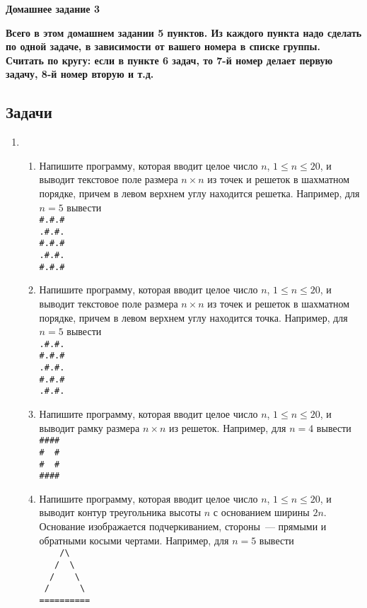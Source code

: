 \documentclass{article}
\begin{document}
\begin{center}
\bf\Large  Домашнее задание 3
\end{center}

\noindent 
\textbf{Всего в этом домашнем задании 5 пунктов. Из каждого пункта надо сделать по одной задаче, в зависимости от вашего номера в списке группы. Считать по кругу: если в пункте 6 задач, то 7-й номер делает первую задачу, 8-й номер вторую и т.д.}

\medskip
\noindent 

\subsection*{Задачи}
\begin{enumerate}[label={}, leftmargin=0pt, itemindent=0pt]
\item
\begin{enumerate}[label=\arabic{enumi}.\arabic*.]
\item
Напишите программу, которая вводит целое число $n$, $1\leqslant n \leqslant 20$, и выводит текстовое поле размера $n\times n$ из точек и решеток в шахматном порядке, причем в левом верхнем углу находится решетка.
Например, для $n=5$ вывести\\
\verb!#.#.#!\\
\verb!.#.#.!\\
\verb!#.#.#!\\
\verb!.#.#.!\\
\verb!#.#.#!
\item 
Напишите программу, которая вводит целое число $n$, $1\leqslant n \leqslant 20$, и выводит текстовое поле размера $n\times n$ из точек и решеток в шахматном порядке, причем в левом верхнем углу находится точка.
Например, для $n=5$ вывести\\
\verb!.#.#.!\\
\verb!#.#.#!\\
\verb!.#.#.!\\
\verb!#.#.#!\\
\verb!.#.#.!
\item 
Напишите программу, которая вводит целое число $n$, $1\leqslant n \leqslant 20$, и выводит рамку размера $n\times n$ из решеток. Например, для $n=4$ вывести\\
\verb!#### !\\
\verb!#  # !\\
\verb!#  # !\\
\verb!#### !
\item 
Напишите программу, которая вводит целое число $n$, $1\leqslant n \leqslant 20$, и выводит контур треугольника высоты $n$ с основанием ширины $2n$. Основание изображается подчеркиванием, стороны~--- прямыми и обратными косыми чертами. Например, для $n=5$ вывести\\\newpage
\verb!    /\!\\
\verb!   /  \!\\
\verb!  /    \!\\
\verb! /      \!\\
\verb!==========!
\end{enumerate}
\hrulefill


\end{enumerate}
\end{document}
